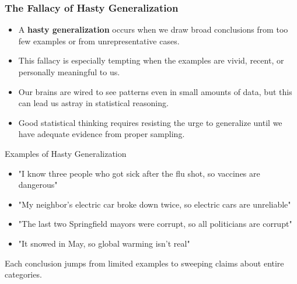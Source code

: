 \documentclass{beamer}
\begin{document}
		\begin{frame}
			\frametitle{The Fallacy of Hasty Generalization}
			
			\begin{itemize}
				\item A \textbf{hasty generalization} occurs when we draw broad conclusions from too few examples or from unrepresentative cases.
				\item This fallacy is especially tempting when the examples are vivid, recent, or personally meaningful to us.
				\item Our brains are wired to see patterns even in small amounts of data, but this can lead us astray in statistical reasoning.
				\item Good statistical thinking requires resisting the urge to generalize until we have adequate evidence from proper sampling.
			\end{itemize}
			
			\begin{block}{Examples of Hasty Generalization}
				\scriptsize
				\begin{itemize}
					\item "I know three people who got sick after the flu shot, so vaccines are dangerous"
					\item "My neighbor's electric car broke down twice, so electric cars are unreliable"
					\item "The last two Springfield mayors were corrupt, so all politicians are corrupt"
					\item "It snowed in May, so global warming isn't real"
				\end{itemize}
				Each conclusion jumps from limited examples to sweeping claims about entire categories.
			\end{block}
			
		\end{frame}
		
		
\end{document}
